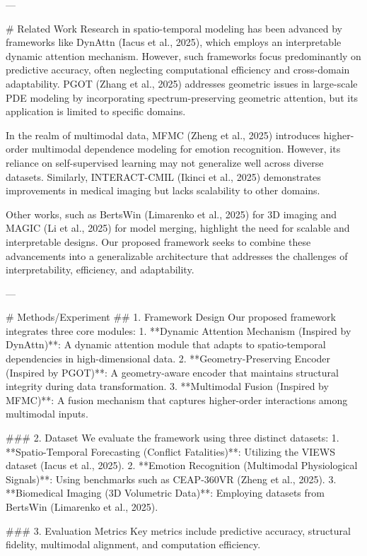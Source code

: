 ---

# Related Work  
Research in spatio-temporal modeling has been advanced by frameworks like DynAttn (Iacus et al., 2025), which employs an interpretable dynamic attention mechanism. However, such frameworks focus predominantly on predictive accuracy, often neglecting computational efficiency and cross-domain adaptability. PGOT (Zhang et al., 2025) addresses geometric issues in large-scale PDE modeling by incorporating spectrum-preserving geometric attention, but its application is limited to specific domains.  

In the realm of multimodal data, MFMC (Zheng et al., 2025) introduces higher-order multimodal dependence modeling for emotion recognition. However, its reliance on self-supervised learning may not generalize well across diverse datasets. Similarly, INTERACT-CMIL (Ikinci et al., 2025) demonstrates improvements in medical imaging but lacks scalability to other domains.  

Other works, such as BertsWin (Limarenko et al., 2025) for 3D imaging and MAGIC (Li et al., 2025) for model merging, highlight the need for scalable and interpretable designs. Our proposed framework seeks to combine these advancements into a generalizable architecture that addresses the challenges of interpretability, efficiency, and adaptability.  

---

# Methods/Experiment  
## 1. Framework Design  
Our proposed framework integrates three core modules:  
1. **Dynamic Attention Mechanism (Inspired by DynAttn)**: A dynamic attention module that adapts to spatio-temporal dependencies in high-dimensional data.  
2. **Geometry-Preserving Encoder (Inspired by PGOT)**: A geometry-aware encoder that maintains structural integrity during data transformation.  
3. **Multimodal Fusion (Inspired by MFMC)**: A fusion mechanism that captures higher-order interactions among multimodal inputs.  

### 2. Dataset  
We evaluate the framework using three distinct datasets:  
1. **Spatio-Temporal Forecasting (Conflict Fatalities)**: Utilizing the VIEWS dataset (Iacus et al., 2025).  
2. **Emotion Recognition (Multimodal Physiological Signals)**: Using benchmarks such as CEAP-360VR (Zheng et al., 2025).  
3. **Biomedical Imaging (3D Volumetric Data)**: Employing datasets from BertsWin (Limarenko et al., 2025).  

### 3. Evaluation Metrics  
Key metrics include predictive accuracy, structural fidelity, multimodal alignment, and computation efficiency.  

